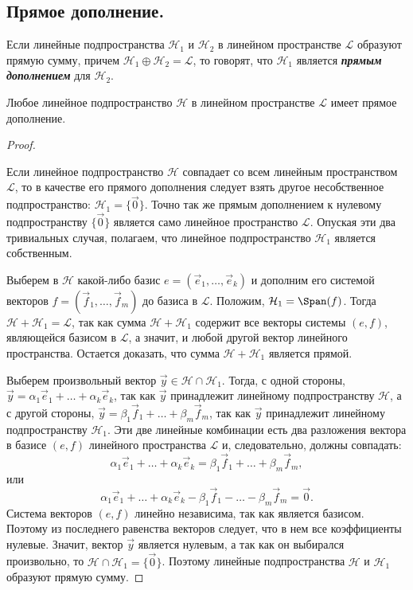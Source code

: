\subsection{
    Прямое дополнение.
}

\begin{definition}
    Если линейные подпространства $\mathcal{H}_1$ и $\mathcal{H}_2$ в линейном пространстве $\mathcal{L}$ образуют прямую сумму, причем $\mathcal{H}_1 \oplus \mathcal{H}_2 = \mathcal{L}$, то говорят, что $\mathcal{H}_1$ является \textit{\textbf{прямым дополнением}} для $\mathcal{H}_2$.
\end{definition}

\begin{theorem}
    Любое линейное подпространство $\mathcal{H}$ в линейном пространстве $\mathcal{L}$ имеет прямое дополнение.
\end{theorem}

\begin{proof}~

    Если линейное подпространство $\mathcal{H}$  совпадает со всем линейным пространством $\mathcal{L}$, то в качестве его прямого дополнения следует взять другое несобственное подпространство: $\mathcal{H}_1 = \{\vec{0}\}$. Точно так же прямым дополнением к нулевому подпространству $\{\vec{0}\}$ является само линейное пространство $\mathcal{L}$. Опуская эти два тривиальных случая, полагаем, что линейное подпространство $\mathcal{H}_1$ является собственным.

    Выберем в $\mathcal{H}$ какой-либо базис $e = (\vec{e}_1, \ldots, \vec{e}_k)$ и дополним его системой векторов $f = (\vec{f}_1, \ldots, \vec{f}_m)$ до базиса в $\mathcal{L}$. Положим, $\mathcal{H}_1 = \Span(f)$. Тогда $\mathcal{H} + \mathcal{H}_1 = \mathcal{L}$, так как сумма $\mathcal{H} + \mathcal{H}_1$ содержит все векторы системы $(e, f)$, являющейся базисом в $\mathcal{L}$, а значит, и любой другой вектор линейного пространства. Остается доказать, что сумма $\mathcal{H} + \mathcal{H}_1$ является прямой.

    Выберем произвольный вектор $\vec{y} \in \mathcal{H} \cap \mathcal{H}_1$. Тогда, с одной стороны, $\vec{y} = \alpha_1\vec{e}_1 + \ldots + \alpha_k\vec{e}_k$, так как $\vec{y}$ принадлежит линейному подпространству $\mathcal{H}$, а с другой стороны, $\vec{y} = \beta_1\vec{f}_1 + \ldots + \beta_m\vec{f}_m$, так как $\vec{y}$ принадлежит линейному подпространству $\mathcal{H}_1$. Эти две линейные комбинации есть два разложения вектора в базисе $(e, f)$ линейного пространства $\mathcal{L}$ и, следовательно, должны совпадать:
    $$\alpha_1\vec{e}_1 + \ldots + \alpha_k\vec{e}_k = \beta_1\vec{f}_1 + \ldots + \beta_m\vec{f}_m,$$
    или
    $$\alpha_1\vec{e}_1 + \ldots + \alpha_k\vec{e}_k - \beta_1\vec{f}_1 - \ldots - \beta_m\vec{f}_m = \vec{0}.$$
    Система векторов $(e, f)$ линейно независима, так как является базисом. Поэтому из последнего равенства векторов следует, что в нем все коэффициенты нулевые. Значит, вектор $\vec{y}$ является нулевым, а так как он выбирался произвольно, то $\mathcal{H} \cap \mathcal{H}_1 = \{\vec{0}\}$. Поэтому линейные подпространства $\mathcal{H}$ и $\mathcal{H}_1$ образуют прямую сумму.
\end{proof}
